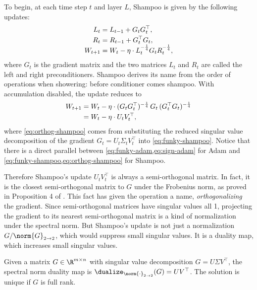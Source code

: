 To begin, at each time step $t$ and layer $L$, Shampoo is given by the following updates:
\begin{align}
    L_t &= L_{t-1} + G_t G_t^\top, \label{eq:L}\\
    R_t &= \smash{R_{t-1} + G_t^\top G_t}, \label{eq:R}\\
    W_{t+1} &= \smash{W_t - \eta \cdot L_t^{-\frac{1}{4}} G_t R_t^{-\frac{1}{4}}},
\end{align}
where $G_t$ is the gradient matrix and the two matrices $L_t$ and $R_t$ are called the left and right preconditioners. Shampoo derives its name from the order of operations when showering: before conditioner comes shampoo. With accumulation disabled, the update reduces to
\begin{align}
    W_{t+1} &= \smash{W_t - \eta \cdot (G_t G_t^\top)^{-\frac{1}{4}} \,G_t\, (G_t^\top G_t)^{-\frac{1}{4}}} \label{eq:funky-shampoo}\\
    &= \smash{W_t - \eta \cdot U_t V_t^\top}, \label{eq:orthog-shampoo}
\end{align}
where \cref{eq:orthog-shampoo} comes from substituting the reduced singular value decomposition of the gradient $G_t = U_t \Sigma_t V_t^\top$ into \cref{eq:funky-shampoo}. Notice that there is a direct parallel between \cref{eq:funky-adam,eq:sign-adam} for Adam and \cref{eq:funky-shampoo,eq:orthog-shampoo} for Shampoo.

Therefore Shampoo's update $U_t V_t^\top$ is always a semi-orthogonal matrix. In fact, it is the closest semi-orthogonal matrix to $G$ under the Frobenius norm, as proved in Proposition 4 of \citet{bernstein2024anthology}. This fact has given the operation a name, \textit{orthogonalizing} the gradient. Since semi-orthogonal matrices have singular values all 1, projecting the gradient to its nearest semi-orthogonal matrix is a kind of normalization under the spectral norm. But Shampoo's update is not just a normalization $G / \norm{G}_{2\to 2}$, which would suppress small singular values. It is a duality map, which increases small singular values.

\begin{theorembox}
    Given a matrix $G \in \R^{m \times n}$ with singular value decomposition $G = U \Sigma V^\top$, the spectral norm duality map is $\dualize_{\norm{\cdot}_{2 \to 2}}(G) = U V^\top$. The solution is unique if $G$ is full rank.
\end{theorembox}

